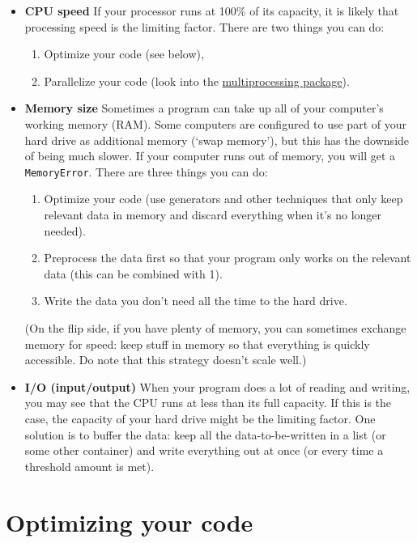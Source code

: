 \documentclass[12pt]{book}
\begin{document}
\begin{itemize}
\item \textbf{CPU speed} If your processor runs at 100\% of its capacity, it is likely that processing speed is the limiting factor. There are two things you can do:
  \begin{enumerate}
  \item Optimize your code (see below),
  \item Parallelize your code (look into the \href{https://docs.python.org/3/library/multiprocessing.html}{multiprocessing package}).
  \end{enumerate}
\item \textbf{Memory size} Sometimes a program can take up all of your computer's working memory (RAM). Some computers are configured to use part of your hard drive as additional memory (`swap memory'), but this has the downside of being much slower. If your computer runs out of memory, you will get a \texttt{MemoryError}. There are three things you can do:
  \begin{enumerate}
  \item Optimize your code (use generators and other techniques that only keep relevant data in memory and discard everything when it's no longer needed).
  \item Preprocess the data first so that your program only works on the relevant data (this can be combined with 1).
  \item Write the data you don't need all the time to the hard drive.
  \end{enumerate}
(On the flip side, if you have plenty of memory, you can sometimes exchange memory for speed: keep stuff in memory so that everything is quickly accessible. Do note that this strategy doesn't scale well.)
\item \textbf{I/O (input/output)} When your program does a lot of reading
  and writing, you may see that the CPU runs at less than its full
  capacity. If this is the case, the capacity of your hard drive might
  be the limiting factor. One solution is to buffer the data: keep all
  the data-to-be-written in a list (or some other container) and write
  everything out at once (or every time a threshold amount is met).
\end{itemize}

\section{Optimizing your code}
\end{document}
